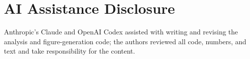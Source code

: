 \documentclass[sigconf,anonymous,nonacm]{acmart}
\begin{document}
\section*{AI Assistance Disclosure}
Anthropic's Claude and OpenAI Codex assisted with writing and revising the analysis and figure-generation code; the authors reviewed all code, numbers, and text and take responsibility for the content.



\end{document}
